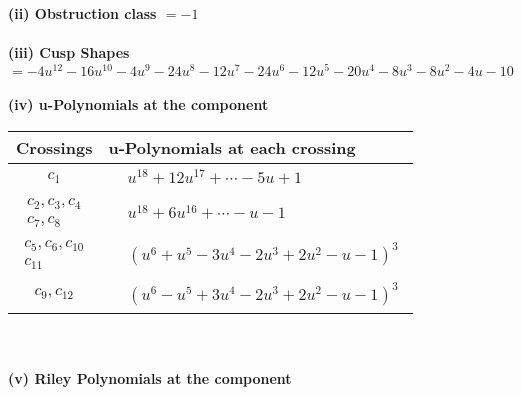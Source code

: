 \documentclass[1p]{elsarticle_modified}
\theoremstyle{definition}
\begin{document}
\flushleft \textbf{(ii) Obstruction class $= -1$}\\~\\
\flushleft \textbf{(iii) Cusp Shapes $= -4 u^{12}-16 u^{10}-4 u^9-24 u^8-12 u^7-24 u^6-12 u^5-20 u^4-8 u^3-8 u^2-4 u-10$}\\~\\
\newpage\renewcommand{\arraystretch}{1}
\flushleft \textbf{(iv) u-Polynomials at the component}\newline \\
\begin{tabular}{m{50pt}|m{274pt}}
Crossings & \hspace{64pt}u-Polynomials at each crossing \\
\hline $$\begin{aligned}c_{1}\end{aligned}$$&$\begin{aligned}
&u^{18}+12 u^{17}+\cdots-5 u+1
\end{aligned}$\\
\hline $$\begin{aligned}c_{2},c_{3},c_{4}\\c_{7},c_{8}\end{aligned}$$&$\begin{aligned}
&u^{18}+6 u^{16}+\cdots- u-1
\end{aligned}$\\
\hline $$\begin{aligned}c_{5},c_{6},c_{10}\\c_{11}\end{aligned}$$&$\begin{aligned}
&(u^6+u^5-3 u^4-2 u^3+2 u^2- u-1)^3
\end{aligned}$\\
\hline $$\begin{aligned}c_{9},c_{12}\end{aligned}$$&$\begin{aligned}
&(u^6- u^5+3 u^4-2 u^3+2 u^2- u-1)^3
\end{aligned}$\\
\hline
\end{tabular}\\~\\
\newpage\renewcommand{\arraystretch}{1}
\flushleft \textbf{(v) Riley Polynomials at the component}\newline \\
\end{document}
